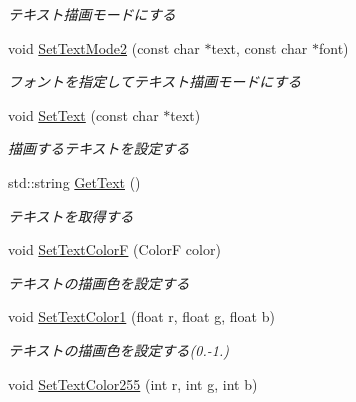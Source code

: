 \begin{DoxyCompactItemize}
\begin{DoxyCompactList}\small\item\em テキスト描画モードにする \end{DoxyCompactList}\item 
void \hyperlink{class_sprite_a8e3565ccc4488800e51b32cdd11a2420}{Set\+Text\+Mode2} (const char $\ast$text, const char $\ast$font)\hypertarget{class_sprite_a8e3565ccc4488800e51b32cdd11a2420}{}\label{class_sprite_a8e3565ccc4488800e51b32cdd11a2420}

\begin{DoxyCompactList}\small\item\em フォントを指定してテキスト描画モードにする \end{DoxyCompactList}\item 
void \hyperlink{class_sprite_a99210c1ece23e87b442d88beabab511d}{Set\+Text} (const char $\ast$text)\hypertarget{class_sprite_a99210c1ece23e87b442d88beabab511d}{}\label{class_sprite_a99210c1ece23e87b442d88beabab511d}

\begin{DoxyCompactList}\small\item\em 描画するテキストを設定する \end{DoxyCompactList}\item 
std\+::string \hyperlink{class_sprite_ada760c966df1e9bf4ae99258ce9d415f}{Get\+Text} ()\hypertarget{class_sprite_ada760c966df1e9bf4ae99258ce9d415f}{}\label{class_sprite_ada760c966df1e9bf4ae99258ce9d415f}

\begin{DoxyCompactList}\small\item\em テキストを取得する \end{DoxyCompactList}\item 
void \hyperlink{class_sprite_aee4258d6eeeff4d498e8b9c2f10be7e2}{Set\+Text\+ColorF} (ColorF color)\hypertarget{class_sprite_aee4258d6eeeff4d498e8b9c2f10be7e2}{}\label{class_sprite_aee4258d6eeeff4d498e8b9c2f10be7e2}

\begin{DoxyCompactList}\small\item\em テキストの描画色を設定する \end{DoxyCompactList}\item 
void \hyperlink{class_sprite_aa888b89fabd743e903efa2402d002f46}{Set\+Text\+Color1} (float r, float g, float b)\hypertarget{class_sprite_aa888b89fabd743e903efa2402d002f46}{}\label{class_sprite_aa888b89fabd743e903efa2402d002f46}

\begin{DoxyCompactList}\small\item\em テキストの描画色を設定する(0.-\/1.) \end{DoxyCompactList}\item 
void \hyperlink{class_sprite_a32887a481da8a5e23e072b3747a8f798}{Set\+Text\+Color255} (int r, int g, int b)\hypertarget{class_sprite_a32887a481da8a5e23e072b3747a8f798}{}\label{class_sprite_a32887a481da8a5e23e072b3747a8f798}


\end{DoxyCompactItemize}
